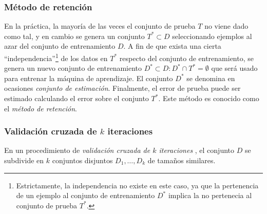 \documentclass[12pt,bibliography=oldstyle,DIV=12,parskip=half-]{scrreprt}
\newcommand{\e}{\emph}
\begin{document}
\subsubsection{Método de retención}
%
En la práctica, la mayoría de las veces el conjunto de prueba $T$ no
viene dado como tal, y en cambio se genera un conjunto $T^*\subset{}D$
seleccionando ejemplos al azar del conjunto de entrenamiento $D$.  A
fin de que exista una cierta ``independencia''\footnote{Estrictamente,
  la independencia no existe en este caso, ya que la pertenencia de un
  ejemplo al conjunto de entrenamiento $D^*$ implica la no pertenecia
  al conjunto de prueba $T^*$.} de los datos en $T^*$ respecto del
conjunto de entrenamiento, se genera un nuevo conjunto de entrenamiento
$D^*\subset{}D:D^*\cap{}T^*=\emptyset$ que será usado para entrenar la
máquina de aprendizaje. El conjunto $D^*$ se denomina en ocasiones
\e{conjunto de estimación}.
Finalmente, el error de prueba puede ser estimado calculando el error
sobre el conjunto $T^*$. Este método es conocido como el \e{método de
  retención}.
%
%
%
%
\subsubsection{Validación cruzada de $k$ iteraciones}
%
%
En un procedimiento de \emph{validación cruzada de $k$ iteraciones}
\cite{crossval}, el conjunto $D$ se subdivide en $k$ conjuntos
disjuntos $D_1,\ldots,D_k$ de tamaños similares.
\end{document}
